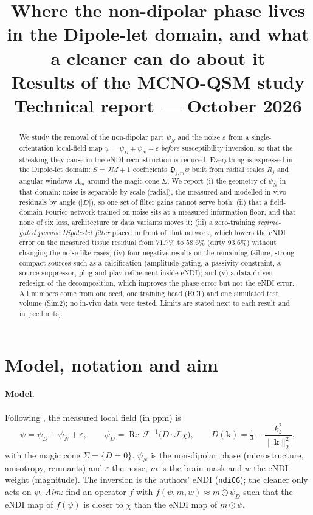 \documentclass[11pt]{article}
\title{\textbf{Where the non-dipolar phase lives in the Dipole-let domain, and what a cleaner can do about it}\\[2pt]
\large Results of the MCNO-QSM study\\[2pt]
\normalsize Technical report --- October 2026}
\author{}
\date{}
\newcommand{\F}{\mathcal{F}}
\newcommand{\bk}{\bm{k}}
\newcommand{\md}{\mathfrak{D}}
\newcommand{\norm}[1]{\lVert #1\rVert}
\newcommand{\abs}[1]{\lvert #1\rvert}
\newcommand{\Real}{\operatorname{Re}}
\newcommand{\code}[1]{\texttt{#1}}
\begin{document}
\maketitle

\begin{abstract}
\noindent
We study the removal of the non-dipolar part $\psi_N$ and the noise $\varepsilon$ from a single-orientation local-field map $\psi=\psi_D+\psi_N+\varepsilon$ \emph{before} susceptibility inversion, so that the streaking they cause in the eNDI reconstruction is reduced.
Everything is expressed in the Dipole-let domain: $S=JM+1$ coefficients $\md_{j,m}\psi$ built from radial scales $R_j$ and angular windows $A_m$ around the magic cone $\Sigma$.
We report (i) the geometry of $\psi_N$ in that domain: noise is separable by scale (radial), the measured and modelled in-vivo residuals by angle ($\abs D$), so one set of filter gains cannot serve both; (ii) that a field-domain Fourier network trained on noise sits at a measured information floor, and that none of six loss, architecture or data variants moves it; (iii) a zero-training \emph{regime-gated passive Dipole-let filter} placed in front of that network, which lowers the eNDI error on the measured tissue residual from $71.7\%$ to $58.6\%$ (dirty $93.6\%$) without changing the noise-like cases; (iv) four negative results on the remaining failure, strong compact sources such as a calcification (amplitude gating, a passivity constraint, a source suppressor, plug-and-play refinement inside eNDI); and (v) a data-driven redesign of the decomposition, which improves the phase error but not the eNDI error.
All numbers come from one seed, one training head (RC1) and one simulated test volume (Sim2); no in-vivo data were tested. Limits are stated next to each result and in \cref{sec:limits}.
\end{abstract}

\tableofcontents
\newpage

\section{Model, notation and aim}\label{sec:model}

\paragraph{Model.} Following \cite{dipolelets}, the measured local field (in ppm) is
\begin{equation}\label{eq:model}
\psi=\psi_D+\psi_N+\varepsilon,\qquad \psi_D=\Real\,\F^{-1}\big(D\cdot\F\chi\big),\qquad D(\bk)=\tfrac13-\frac{k_z^2}{\norm{\bk}_2^2},
\end{equation}
with the magic cone $\Sigma=\{D=0\}$. $\psi_N$ is the non-dipolar phase (microstructure, anisotropy, remnants) and $\varepsilon$ the noise; $m$ is the brain mask and $w$ the eNDI weight (magnitude). The inversion is the authors' eNDI (\code{ndiCG}); the cleaner only acts on $\psi$.
\emph{Aim:} find an operator $f$ with $f(\psi,m,w)\approx m\odot\psi_D$ such that the eNDI map of $f(\psi)$ is closer to $\chi$ than the eNDI map of $m\odot\psi$.
\end{document}
